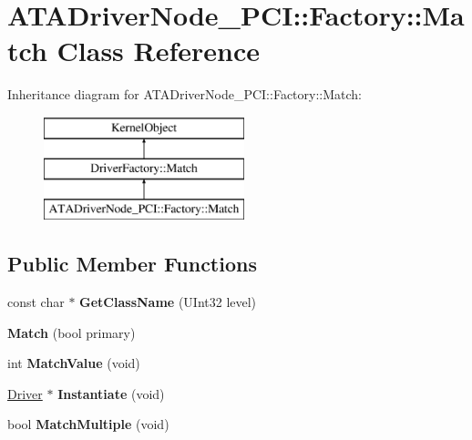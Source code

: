 \hypertarget{class_a_t_a_driver_node___p_c_i_1_1_factory_1_1_match}{}\section{A\+T\+A\+Driver\+Node\+\_\+\+P\+CI\+:\+:Factory\+:\+:Match Class Reference}
\label{class_a_t_a_driver_node___p_c_i_1_1_factory_1_1_match}
Inheritance diagram for A\+T\+A\+Driver\+Node\+\_\+\+P\+CI\+:\+:Factory\+:\+:Match\+:\begin{figure}[H]
\begin{center}
\leavevmode
\includegraphics[height=3.000000cm]{class_a_t_a_driver_node___p_c_i_1_1_factory_1_1_match}
\end{center}
\end{figure}
\subsection*{Public Member Functions}
\begin{DoxyCompactItemize}
\item 
\mbox{\label{class_a_t_a_driver_node___p_c_i_1_1_factory_1_1_match_a11e30e7505354699f1cb60553e6cd86e}} 
const char $\ast$ {\bfseries Get\+Class\+Name} (U\+Int32 level)
\item 
\mbox{\label{class_a_t_a_driver_node___p_c_i_1_1_factory_1_1_match_aae05ca4058363138ccb781aee0e22274}} 
{\bfseries Match} (bool primary)
\item 
\mbox{\label{class_a_t_a_driver_node___p_c_i_1_1_factory_1_1_match_a0354f5956953207ce83a11c0c0ccf28d}} 
int {\bfseries Match\+Value} (void)
\item 
\mbox{\label{class_a_t_a_driver_node___p_c_i_1_1_factory_1_1_match_aea99f920769d9335dbd41ef1cbc83504}} 
\hyperlink{class_driver}{Driver} $\ast$ {\bfseries Instantiate} (void)
\item 
\mbox{\label{class_a_t_a_driver_node___p_c_i_1_1_factory_1_1_match_ab0c0203d701d195f8e736e3ae9ba81a9}} 
bool {\bfseries Match\+Multiple} (void)
\end{DoxyCompactItemize}
